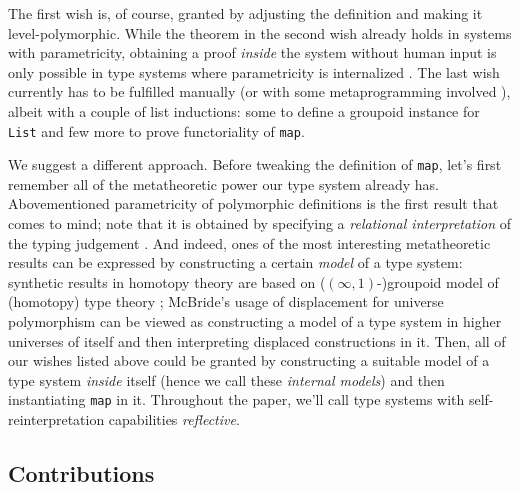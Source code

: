 The first wish is, of course, granted by adjusting the
definition and making it level-polymorphic. While the
theorem in the second wish already holds in systems
with parametricity, obtaining a proof \textit{inside}
the system without human input is only possible in type
systems where parametricity is internalized \cite{
Bernardy:Parametricity2010,
Altenkirch:Parametricity2024}. The last wish currently
has to be fulfilled manually (or with some
metaprogramming involved \cite{Nawrocki:Lean2026}),
albeit with a couple of list inductions: some to define
a groupoid instance for \texttt{List} and few more to
prove functoriality of \texttt{map}.

We suggest a different approach. Before tweaking the
definition of \texttt{map}, let's first remember all of
the metatheoretic power our type system already has.
Abovementioned parametricity of polymorphic definitions
is the first result that comes to mind; note that it is
obtained by specifying a \textit{relational
interpretation} of the typing judgement
\cite{reynolds1983types}. And indeed, ones of the most
interesting metatheoretic results can be expressed by
constructing a certain \textit{model} of a type system:
synthetic results in homotopy theory are based on
($(\infty, 1)$-)groupoid model of (homotopy) type theory
\cite{HofmannStreicher-Thegroupoidmodelref,
altenkirch:groupoids}; McBride's usage of displacement
for universe polymorphism \cite{McBride:Crude2011,
McBride:Crude2012} can be viewed as constructing a model
of a type system in higher universes of itself and then
interpreting displaced constructions in it. Then, all of
our wishes listed above could be granted by constructing
a suitable model of a type system \textit{inside} itself
(hence we call these \textit{internal models}) and then
instantiating \texttt{map} in it. Throughout the paper,
we'll call type systems with self-reinterpretation
capabilities \textit{reflective}.

\subsection{Contributions}

